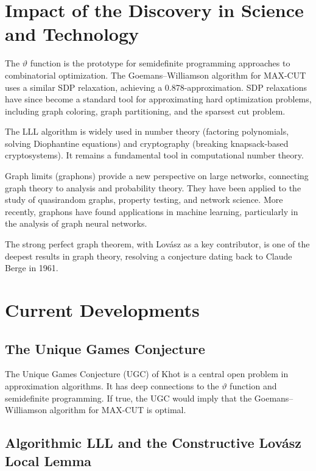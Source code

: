 \section{Impact of the Discovery in Science and Technology}

The $\vartheta$ function is the prototype for semidefinite programming approaches to combinatorial optimization. The Goemans--Williamson algorithm for MAX-CUT uses a similar SDP relaxation, achieving a 0.878-approximation. SDP relaxations have since become a standard tool for approximating hard optimization problems, including graph coloring, graph partitioning, and the sparsest cut problem.

The LLL algorithm is widely used in number theory (factoring polynomials, solving Diophantine equations) and cryptography (breaking knapsack-based cryptosystems). It remains a fundamental tool in computational number theory.

Graph limits (graphons) provide a new perspective on large networks, connecting graph theory to analysis and probability theory. They have been applied to the study of quasirandom graphs, property testing, and network science. More recently, graphons have found applications in machine learning, particularly in the analysis of graph neural networks.

The strong perfect graph theorem, with Lov\'asz as a key contributor, is one of the deepest results in graph theory, resolving a conjecture dating back to Claude Berge in 1961.

\section{Current Developments}

\subsection{The Unique Games Conjecture}

The Unique Games Conjecture (UGC) of Khot is a central open problem in approximation algorithms. It has deep connections to the $\vartheta$ function and semidefinite programming. If true, the UGC would imply that the Goemans--Williamson algorithm for MAX-CUT is optimal.

\subsection{Algorithmic LLL and the Constructive Lov\'asz Local Lemma}

